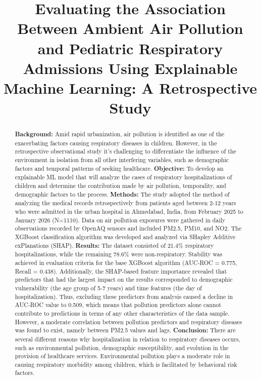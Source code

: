 \documentclass[conference]{IEEEtran}
\begin{document}
\title{Evaluating the Association Between Ambient Air Pollution and Pediatric Respiratory Admissions Using Explainable Machine Learning: A Retrospective Study}

\author{
}

\maketitle

\begin{abstract}
\textbf{Background:} Amid rapid urbanization, air pollution is identified as one of the exacerbating factors causing respiratory diseases in children. However, in the retrospective observational study it’s challenging to differentiate the influence of the environment in isolation from all other interfering variables, such as demographic factors and temporal patterns of seeking healthcare.
\textbf{Objective:} To develop an explainable ML model that will analyze the cases of respiratory hospitalizations of children and determine the contribution made by air pollution, temporality, and demographic factors to the process.
\textbf{Methods:} The study adopted the method of analyzing the medical records retrospectively from patients aged between 2-12 years who were admitted in the urban hospital in Ahmedabad, India, from February 2025 to January 2026 (N=1110). Data on air pollution exposures were gathered in daily observations recorded by OpenAQ sensors and included PM2.5, PM10, and NO2. The XGBoost classification algorithm was developed and analyzed via SHapley Additive exPlanations (SHAP).
\textbf{Results:} The dataset consisted of 21.4\% respiratory hospitalizations, while the remaining 78.6\% were non-respiratory. Stability was achieved in evaluation criteria for the base XGBoost algorithm (AUC-ROC = 0.775, Recall = 0.438). Additionally, the SHAP-based feature importance revealed that predictors that had the largest impact on the results corresponded to demographic vulnerability (the age group of 5-7 years) and time features (the day of hospitalization). Thus, excluding these predictors from analysis caused a decline in AUC-ROC value to 0.509, which means that pollution predictors alone cannot contribute to predictions in terms of any other characteristics of the data sample. However, a moderate correlation between pollution predictors and respiratory diseases was found to exist, namely between PM2.5 values and lags.
\textbf{Conclusion:} There are several different reasons why hospitalization in relation to respiratory diseases occurs, such as environmental pollution, demographic susceptibility, and evolution in the provision of healthcare services. Environmental pollution plays a moderate role in causing respiratory morbidity among children, which is facilitated by behavioral risk factors.
\end{abstract}
\end{document}
